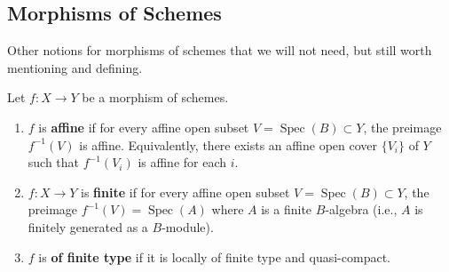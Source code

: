 \documentclass[12pt]{article}
\begin{document}
\subsection{Morphisms of Schemes}
Other notions for morphisms of schemes that we will not need, but still worth mentioning and defining.
\begin{definition}
    Let $f: X \to Y$ be a morphism of schemes.
    \begin{enumerate}
        \item $f$ is \textbf{affine} if for every affine open subset $V = \operatorname{Spec}(B) \subset Y$, the preimage $f^{-1}(V)$ is affine. Equivalently, there exists an affine open cover $\{V_i\}$ of $Y$ such that $f^{-1}(V_i)$ is affine for each $i$.

        \item $f: X \to Y$ is \textbf{finite} if for every affine open subset $V = \operatorname{Spec}(B) \subset Y$, the preimage $f^{-1}(V) = \operatorname{Spec}(A)$ where $A$ is a finite $B$-algebra (i.e., $A$ is finitely generated as a $B$-module).
        \item $f$ is \textbf{of finite type} if it is locally of finite type and quasi-compact.


\end{enumerate}
\end{definition}
\end{document}

